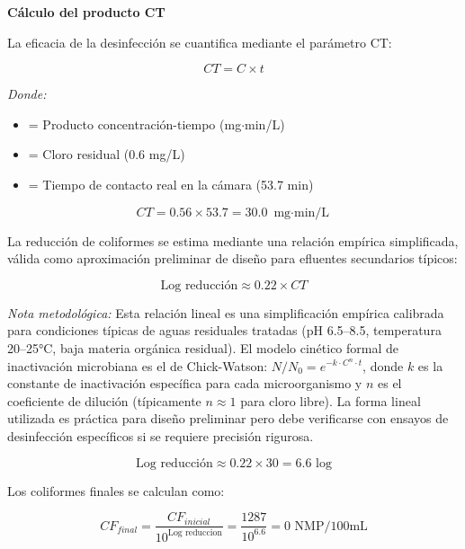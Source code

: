 \documentclass[12pt,a4paper]{article}
\begin{document}
\textbf{Cálculo del producto CT}

La eficacia de la desinfección se cuantifica mediante el parámetro CT:

\begin{equation}
CT = C \times t
\end{equation}

\textit{Donde:}
\begin{itemize}[noitemsep,leftmargin=2em]
    \item[$CT$] = Producto concentración-tiempo (mg$\cdot$min/L)
    \item[$C$] = Cloro residual (0.6 mg/L)
    \item[$t$] = Tiempo de contacto real en la cámara (53.7 min)
\end{itemize}

\begin{equation}
CT = 0.56 \times 53.7 = 30.0 \text{ mg$\cdot$min/L}
\end{equation}

La reducción de coliformes se estima mediante una relación empírica simplificada, válida como aproximación preliminar de diseño para efluentes secundarios típicos:

\begin{equation}
\text{Log reducción} \approx 0.22 \times CT
\end{equation}

\textit{Nota metodológica:} Esta relación lineal es una simplificación empírica calibrada para condiciones típicas de aguas residuales tratadas (pH 6.5--8.5, temperatura 20--25°C, baja materia orgánica residual). El modelo cinético formal de inactivación microbiana es el de Chick-Watson: $N/N_0 = e^{-k \cdot C^n \cdot t}$, donde $k$ es la constante de inactivación específica para cada microorganismo y $n$ es el coeficiente de dilución (típicamente $n \approx 1$ para cloro libre). La forma lineal utilizada es práctica para diseño preliminar pero debe verificarse con ensayos de desinfección específicos si se requiere precisión rigurosa.

\begin{equation}
\text{Log reducción} \approx 0.22 \times 30 = 6.6 \text{ log}
\end{equation}

Los coliformes finales se calculan como:

\begin{equation}
CF_{final} = \frac{CF_{inicial}}{10^{\text{Log reduccion}}} = \frac{1287}{10^{6.6}} = 0 \text{ NMP/100mL}
\end{equation}
\end{document}
